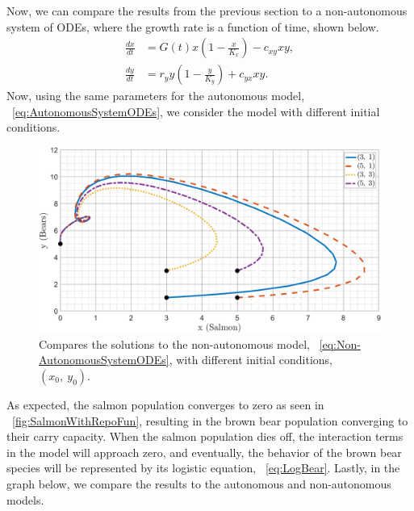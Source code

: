 Now, we can compare the results from the previous section to a non-autonomous system of ODEs, where the growth rate is a function of time, shown below.
\begin{equation}\label{eq:Non-AutonomousSystemODEs}
    \begin{aligned}
    \frac{dx}{dt} &=G(t)x\left(1-\frac{x}{K_x}\right) - c_{xy}xy,\\[.4cm]
    \frac{dy}{dt} &=r_yy\left(1-\frac{y}{K_y}\right) + c_{yx}xy.
    \end{aligned}
\end{equation}
Now, using the same parameters for the autonomous model, \equationautorefname~\eqref{eq:AutonomousSystemODEs}, we consider the model with different initial conditions.
\begin{figure}[H]
    \centering
    \includegraphics[width=14cm]{Pictures/Stability/SolutionsNonAutonomousModel.png}
    \caption{\singlespacing
    Compares the solutions to the non-autonomous model, \equationautorefname~\eqref{eq:Non-AutonomousSystemODEs}, with different initial conditions, $(x_0,\ y_0)$.}
    \label{fig:Non-AutonomousSystemODEs}
\end{figure}
As expected, the salmon population converges to zero as seen in \figureautorefname~\ref{fig:SalmonWithRepoFun}, resulting in the brown bear population converging to their carry capacity.
When the salmon population dies off, the interaction terms in the model will approach zero, and eventually, the behavior of the brown bear species will be represented by its logistic equation, \equationautorefname~\eqref{eq:LogBear}.
Lastly, in the graph below, we compare the results to the autonomous and non-autonomous models.
